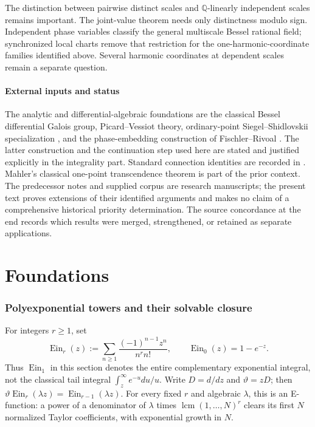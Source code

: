 \documentclass[11pt]{article}
\theoremstyle{definition}
\theoremstyle{remark}
\newcommand{\Ein}{\operatorname{Ein}}
\begin{document}
The distinction between pairwise distinct scales and
$\mathbb Q$-linearly independent scales remains important. The joint-value
theorem needs only distinctness modulo sign. Independent phase variables
classify the general multiscale Bessel rational field; synchronized local
charts remove that restriction for the one-harmonic-coordinate families
identified above. Several harmonic coordinates at dependent scales
remain a separate question.

\subsection{External inputs and status}
The analytic and differential-algebraic foundations are the classical
Bessel differential Galois group, Picard--Vessiot theory, ordinary-point
Siegel--Shidlovskii specialization \cite{Beukers,Kolchin}, and the
phase-embedding construction of Fischler--Rivoal \cite{FR26}.
The latter construction and the continuation step used here are stated
and justified explicitly in the integrality part. Standard connection
identities are recorded in \cite{DLMF}. Mahler's classical one-point
transcendence theorem \cite{Mahler} is part of the prior context.
The predecessor notes and supplied corpus are research manuscripts;
the present text proves extensions of their identified arguments and
makes no claim of a comprehensive historical priority determination.
The source concordance at the end records which results were merged,
strengthened, or retained as separate applications.


\part{Foundations}
\section{Polyexponential towers and their solvable closure}
\label{pj:section}

For integers $r\geq1$, set
\[
 \Ein_r(z):=\sum_{n\geq1}\frac{(-1)^{n-1}z^n}{n^r n!},
 \qquad \Ein_0(z)=1-e^{-z}.
\]
Thus $\Ein_1$ in this section denotes the entire complementary exponential
integral, not the classical tail integral $\int_z^\infty e^{-u}du/u$.
Write $D=d/dz$ and $\vartheta=zD$; then
$\vartheta \Ein_r(\lambda z)=\Ein_{r-1}(\lambda z)$.
For every fixed $r$ and algebraic $\lambda$, this is an E-function:
a power of a denominator of $\lambda$ times
$\operatorname{lcm}(1,\ldots,N)^r$ clears its first $N$ normalized Taylor
coefficients, with exponential growth in $N$.
\end{document}
